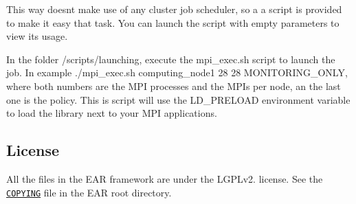 This way doesn\textquotesingle{}t make use of any cluster job scheduler, so a a script is provided to make it easy that task. You can launch the script with empty parameters to view it\textquotesingle{}s usage.

In the folder {\ttfamily /scripts/launching}, execute the {\ttfamily mpi\+\_\+exec.\+sh} script to launch the job. In example {\ttfamily ./mpi\+\_\+exec.sh computing\+\_\+node1 28 28 M\+O\+N\+I\+T\+O\+R\+I\+N\+G\+\_\+\+O\+N\+LY}, where both numbers are the M\+PI processes and the M\+PI\textquotesingle{}s per node, an the last one is the policy. This is script will use the {\ttfamily L\+D\+\_\+\+P\+R\+E\+L\+O\+AD} environment variable to load the library next to your M\+PI applications.

\subsection*{License }

All the files in the E\+AR framework are under the L\+G\+P\+Lv2. license. See the \href{../../COPYING}{\tt C\+O\+P\+Y\+I\+NG} file in the E\+AR root directory. 